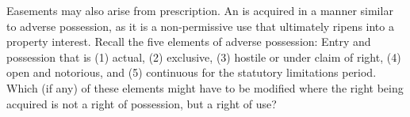 
Easements may also arise from prescription. An 
is
acquired in a manner similar to adverse possession, as it is a non-permissive
use that ultimately ripens into a property interest. Recall the five elements of
adverse possession: Entry and possession that is (1) actual, (2) exclusive, (3)
hostile or under claim of right, (4) open and notorious, and (5) continuous for
the statutory limitations period. Which (if any) of these elements might have to
be modified where the right being acquired is not a right of possession, but a
right of use?


